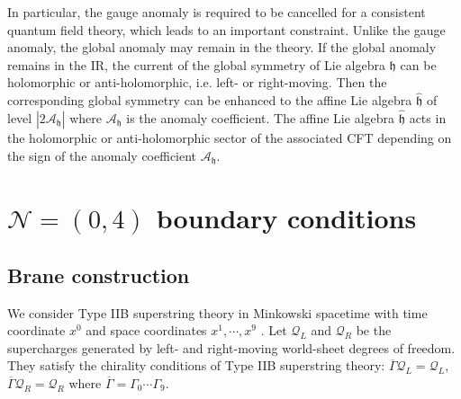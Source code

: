 \documentclass{article}
\numberwithin{equation}{section}
\begin{document}
In particular, the gauge anomaly is required to be cancelled for a consistent quantum field theory, 
which leads to an important constraint. 
Unlike the gauge anomaly, the global anomaly may remain in the theory. 
If the global anomaly remains in the IR, the current of the global symmetry of Lie algebra $\mathfrak{h}$ 
can be holomorphic or anti-holomorphic, i.e. left- or right-moving. 
Then  the corresponding global symmetry can be enhanced to 
the affine Lie algebra $\widehat{\mathfrak{h}}$ of level $|2\mathcal{A}_{\mathfrak{h}}|$ 
where $\mathcal{A}_{\mathfrak{h}}$ is the anomaly coefficient. 
The affine Lie algebra $\widehat{\mathfrak{h}}$ acts in the holomorphic or anti-holomorphic sector of the associated CFT 
depending on the sign of the anomaly coefficient $\mathcal{A}_{\mathfrak{h}}$. 


 

















\section{$\mathcal{N}=(0,4)$ boundary conditions}
\label{sec_04bcbrane}




\subsection{Brane construction}
\label{sec_04bcbrane_1}
We consider Type IIB superstring theory in Minkowski spacetime 
with time coordinate $x^{0}$ and space coordinates $x^{1},\cdots, x^{9}$ \cite{Hanany:1996ie}. 
Let $\mathcal{Q}_{L}$ and $\mathcal{Q}_{R}$ be the supercharges 
generated by left- and right-moving world-sheet degrees of freedom. 
They satisfy the chirality conditions of Type IIB superstring theory:  
$\overline{\Gamma}\mathcal{Q}_{L}=\mathcal{Q}_{L}$, $\overline{\Gamma}\mathcal{Q}_{R}=\mathcal{Q}_{R}$ 
where $\overline{\Gamma}=\Gamma_{0}\cdots \Gamma_{9}$. 
\end{document}
